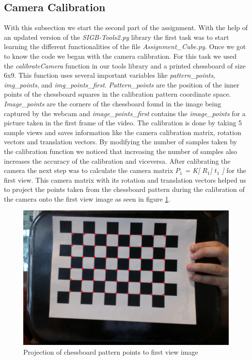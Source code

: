 \subsection{Camera Calibration}
With this subsection we start the second part of the assignment. With the help of an updated version of the \textsl{SIGB-Tools2.py} library the first task was to start learning the different functionalities of the file \textsl{Assignment\_Cube.py}. Once we got to know the code we began with the camera calibration. For this task we used the \textsl{calibrateCamera} function in our tools library and a printed chessboard of size 6x9. This function uses several important variables like \textsl{pattern\_points}, \textsl{img\_points}, and \textsl{img\_points\_first}. \textsl{Pattern\_points} are the position of the inner points of the chessboard squares in the calibration pattern coordinate space. \textsl{Image\_points} are the corners of the chessboard found in the image being captured by the webcam and \textsl{image\_points\_first} contains the \textsl{image\_points} for a picture taken in the first frame of the video. 
The calibration is done by taking 5 sample views and saves information like the camera calibration matrix, rotation vectors and translation vectors. By modifying the number of samples taken by the calibration function we noticed that increasing the number of samples also increases the accuracy of the calibration and viceversa.\newline 
After calibrating the camera the next step was to calculate the camera matrix  \textsl{ \(P_1\) = K[ \(R_1\)| \(t_1\) ]} for the first view. This camera matrix with its rotation and translation vectors helped us to project the points taken from the chessboard pattern during the calibration of the camera onto the first view image as seen in figure \ref{fig:projection}. 
\begin{figure}
	\centering
	\includegraphics[scale=0.3]{images/projection_p1.jpg}
	\caption{Projection of chessboard pattern points to first view image}
	\label{fig:projection}
\end{figure}

